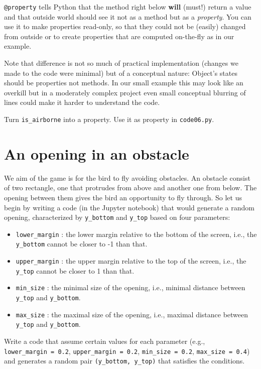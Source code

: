\documentclass[
]{book}
\providecommand{\tightlist}{%
  \setlength{\itemsep}{0pt}\setlength{\parskip}{0pt}}
\begin{document}
\texttt{@property} tells Python that the method right below \textbf{will} (must!) return a value and that outside world should see it not as a method but as a \emph{property}. You can use it to make properties read-only, so that they could not be (easily) changed from outside or to create properties that are computed on-the-fly as in our example.

Note that difference is not so much of practical implementation (changes we made to the code were minimal) but of a conceptual nature: Object's states should be properties not methods. In our small example this may look like an overkill but in a moderately complex project even small conceptual blurring of lines could make it harder to understand the code.

Turn \texttt{is\_airborne} into a property.
Use it as property in \texttt{code06.py}.

\hypertarget{an-opening-in-an-obstacle}{%
\section{An opening in an obstacle}\label{an-opening-in-an-obstacle}}

We aim of the game is for the bird to fly avoiding obstacles. An obstacle consist of two rectangle, one that protrudes from above and another one from below. The opening between them gives the bird an opportunity to fly through. So let us begin by writing a code (in the Jupyter notebook) that would generate a random opening, characterized by \texttt{y\_bottom} and \texttt{y\_top} based on four parameters:

\begin{itemize}
\tightlist
\item
  \texttt{lower\_margin} : the lower margin relative to the bottom of the screen, i.e., the \texttt{y\_bottom} cannot be closer to -1 than that.
\item
  \texttt{upper\_margin} : the upper margin relative to the top of the screen, i.e., the \texttt{y\_top} cannot be closer to 1 than that.
\item
  \texttt{min\_size} : the minimal size of the opening, i.e., minimal distance between \texttt{y\_top} and \texttt{y\_bottom}.
\item
  \texttt{max\_size} : the maximal size of the opening, i.e., maximal distance between \texttt{y\_top} and \texttt{y\_bottom}.
\end{itemize}

Write a code that assume certain values for each parameter (e.g., \texttt{lower\_margin\ =\ 0.2}, \texttt{upper\_margin\ =\ 0.2}, \texttt{min\_size\ =\ 0.2}, \texttt{max\_size\ =\ 0.4}) and generates a random pair \texttt{(y\_bottom,\ y\_top)} that satisfies the conditions.
\end{document}
